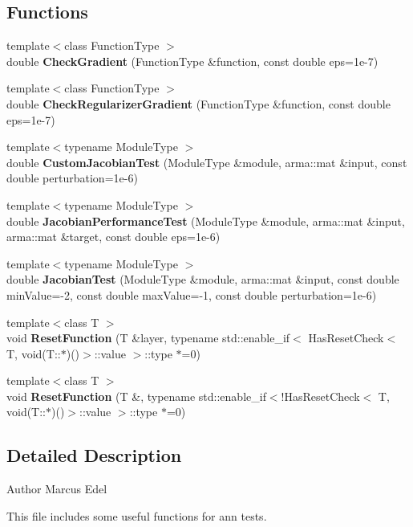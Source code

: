\subsection*{Functions}
\begin{DoxyCompactItemize}
\item 
{\footnotesize template$<$class Function\+Type $>$ }\\double \textbf{ Check\+Gradient} (Function\+Type \&function, const double eps=1e-\/7)
\item 
{\footnotesize template$<$class Function\+Type $>$ }\\double \textbf{ Check\+Regularizer\+Gradient} (Function\+Type \&function, const double eps=1e-\/7)
\item 
{\footnotesize template$<$typename Module\+Type $>$ }\\double \textbf{ Custom\+Jacobian\+Test} (Module\+Type \&module, arma\+::mat \&input, const double perturbation=1e-\/6)
\item 
{\footnotesize template$<$typename Module\+Type $>$ }\\double \textbf{ Jacobian\+Performance\+Test} (Module\+Type \&module, arma\+::mat \&input, arma\+::mat \&target, const double eps=1e-\/6)
\item 
{\footnotesize template$<$typename Module\+Type $>$ }\\double \textbf{ Jacobian\+Test} (Module\+Type \&module, arma\+::mat \&input, const double min\+Value=-\/2, const double max\+Value=-\/1, const double perturbation=1e-\/6)
\item 
{\footnotesize template$<$class T $>$ }\\void \textbf{ Reset\+Function} (T \&layer, typename std\+::enable\+\_\+if$<$ Has\+Reset\+Check$<$ T, void(T\+::$\ast$)()$>$\+::value $>$\+::type $\ast$=0)
\item 
{\footnotesize template$<$class T $>$ }\\void \textbf{ Reset\+Function} (T \&, typename std\+::enable\+\_\+if$<$!Has\+Reset\+Check$<$ T, void(T\+::$\ast$)()$>$\+::value $>$\+::type $\ast$=0)
\end{DoxyCompactItemize}


\subsection{Detailed Description}
\begin{DoxyAuthor}{Author}
Marcus Edel
\end{DoxyAuthor}
This file includes some useful functions for ann tests.

